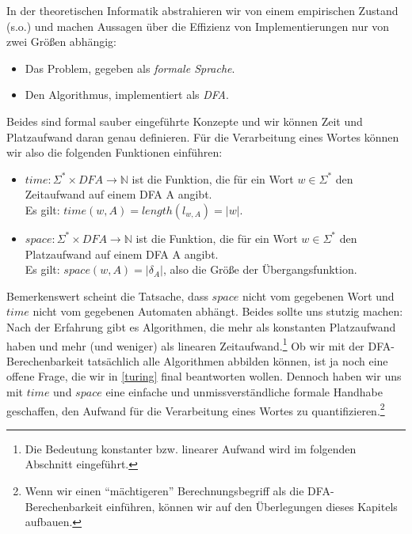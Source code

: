 In der theoretischen Informatik abstrahieren wir von einem empirischen Zustand (s.o.)
und machen Aussagen über die Effizienz von Implementierungen nur von zwei Größen abhängig:
\begin{itemize}
    \item Das Problem, gegeben als \emph{formale Sprache}.
    \item Den Algorithmus, implementiert als \emph{DFA}.
\end{itemize}
Beides sind formal sauber eingeführte Konzepte
und wir können Zeit und Platzaufwand daran genau definieren.
Für die Verarbeitung eines Wortes können wir also die folgenden Funktionen einführen:
\begin{itemize}
    \item $time: \Sigma^* \times DFA \rightarrow \mathbb{N}$ ist die Funktion,
        die für ein Wort $w \in \Sigma^*$ den Zeitaufwand auf einem DFA A angibt.\\
        Es gilt: $time(w,A) =  length(l_{w,A}) = |w|$.
    \item $space: \Sigma^* \times DFA \rightarrow \mathbb{N}$ ist die Funktion,
        die für ein Wort $w  \in \Sigma^*$ den Platzaufwand auf einem DFA A angibt.\\
        Es gilt: $space(w,A) = |\delta_{A}|$, also die Größe der Übergangsfunktion.
\end{itemize}

Bemerkenswert scheint die Tatsache, dass $space$ nicht vom gegebenen Wort 
und $time$ nicht vom gegebenen Automaten abhängt.
Beides sollte uns stutzig machen:
Nach der Erfahrung gibt es Algorithmen, die mehr als konstanten Platzaufwand haben
und mehr (und weniger) als linearen Zeitaufwand.\footnote{
    Die Bedeutung konstanter bzw. linearer Aufwand wird im folgenden Abschnitt eingeführt.}
Ob wir mit der DFA-Berechenbarkeit tatsächlich alle Algorithmen abbilden können,
ist ja noch eine offene Frage, die wir in \autoref{turing} final beantworten wollen.
Dennoch haben wir uns mit $time$ und $space$
eine einfache und unmissverständliche formale Handhabe geschaffen,
den Aufwand für die Verarbeitung eines Wortes zu quantifizieren.\footnote{
Wenn wir einen ``mächtigeren'' Berechnungsbegriff als die DFA-Berechenbarkeit einführen,
können wir auf den Überlegungen dieses Kapitels aufbauen.}


